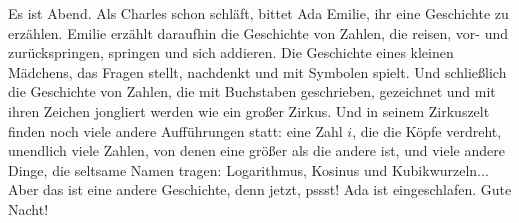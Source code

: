 Es ist Abend. Als Charles schon schläft, bittet Ada Emilie, ihr eine Geschichte zu erzählen. Emilie erzählt daraufhin die Geschichte von Zahlen, die reisen, vor- und zurückspringen, springen und sich addieren. Die Geschichte eines kleinen Mädchens, das Fragen stellt, nachdenkt und mit Symbolen spielt. Und schließlich die Geschichte von Zahlen, die mit Buchstaben geschrieben, gezeichnet und mit ihren Zeichen jongliert werden wie ein großer Zirkus. Und in seinem Zirkuszelt finden noch viele andere Aufführungen statt: eine Zahl $i$, die die Köpfe verdreht, unendlich viele Zahlen, von denen eine größer als die andere ist, und viele andere Dinge, die seltsame Namen tragen: Logarithmus, Kosinus und Kubikwurzeln...
Aber das ist eine andere Geschichte, denn jetzt, pssst! Ada ist eingeschlafen. Gute Nacht!

\vspace*{\fill}
